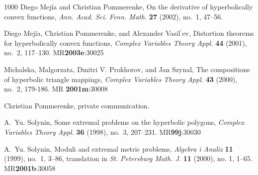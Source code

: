 \documentclass{cmft}
\begin{document}
\begin{thebibliography}{1000}
 Diego Mej\'ia and Christian Pommerenke, On the derivative of
hyperbolically convex functions, \emph{Ann.  Acad. Sci. Fenn. Math.} \textbf{27}
(2002), no.~1, 47--56.

 Diego Mej\'ia, Christian Pommerenke, and Alexander 
Vasil$^\prime$ev,
Distortion theorems for hyperbolically convex functions, \emph{Complex Variables
Theory Appl.} \textbf{44} (2001), no.~2, 117--130. MR\textbf{2003e}:30025

 Michalska, Malgorzata, Dmitri V. Prokhorov, and Jan Szynal, 
 The compositions of hyperbolic triangle mappings, \emph{Complex Variables
Theory Appl.} \textbf{43} (2000), no.~2, 179-186. MR \textbf{2001m}:30008

 Christian Pommerenke, private communication.

 A.~Yu. Solynin, Some extremal problems on the hyperbolic polygons,
\emph{Complex Variables Theory Appl.} \textbf{36} (1998), no.~3, 207--231.
MR\textbf{99j}:30030

 A.~Yu. Solynin, Moduli and extremal metric problems, \emph{Algebra
i Analiz} \textbf{11} (1999), no.~1, 3--86, translation in \emph{St. Petersburg
Math. J.}  \textbf{11} (2000), no. 1, 1--65. MR\textbf{2001b}:30058


\end{thebibliography}
\setcounter{equation}{0} %
\end{document}
